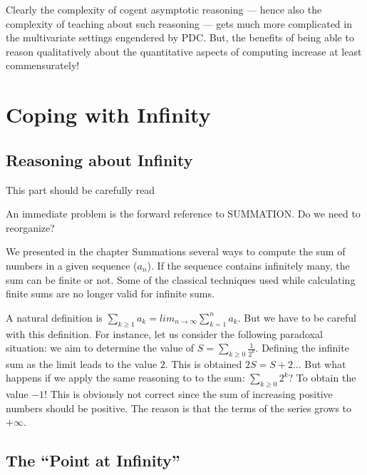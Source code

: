 Clearly the complexity of cogent asymptotic reasoning --- hence also
the complexity of teaching about such reasoning --- gets much more
complicated in the multivariate settings engendered by PDC.  But, the
benefits of being able to reason qualitatively about the quantitative
aspects of computing increase at least commensurately!



\section{Coping with Infinity}
\label{sec:reasoning-infinity}

\subsection{Reasoning about Infinity}

{\Denis This part should be carefully read}

{\Arny An immediate problem is the forward reference to SUMMATION.  Do
  we need to reorganize?}

We presented in the chapter Summations several ways to compute the sum
of numbers in a given sequence ($a_n$).  If the sequence contains
infinitely many, the sum can be finite or not.  Some of the classical
techniques used while calculating finite sums are no longer valid for
infinite sums.


A natural definition is $\sum_{k \geq 1} a_k = lim_{n \rightarrow \infty} \sum_{k=1}^{n} a_k$.
But we have to be careful with this definition. 
For instance, let us consider the following paradoxal situation:
we aim to determine the value of $S = \sum_{k \geq 0} \frac{1}{2^k}$.
Defining the infinite sum as the limit leads to the value $2$. 
This is obtained $2S = S+2$...
But what happens if we apply the same reasoning to to the sum: $\sum _{k \geq 0} 2^k$?
To obtain the value $-1$!
This is obviously not correct since the sum of increasing positive numbers should be positive.
The reason is that the terms of the series grows to $+\infty$.


\subsection{The ``Point at Infinity''}
\label{sec:point-at-infinity}

